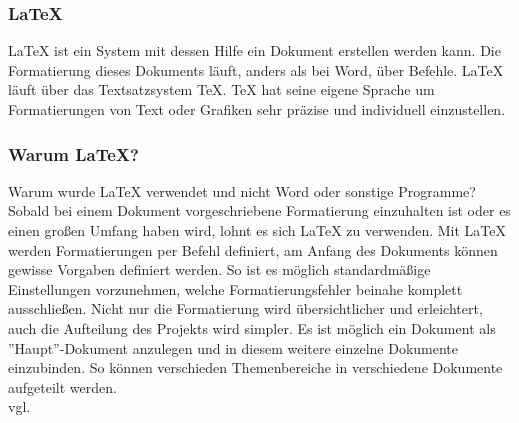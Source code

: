 \subsubsection {LaTeX}
\label{sec:LaTeX}
LaTeX ist ein System mit dessen Hilfe ein Dokument erstellen werden kann. Die Formatierung dieses Dokuments läuft, anders als bei Word, über Befehle. LaTeX läuft über das Textsatzsystem TeX. TeX hat seine eigene Sprache um Formatierungen von Text oder Grafiken sehr präzise und individuell einzustellen. 
\subsubsection{Warum LaTeX?} 
\label{sec:WarumLaTeX}
Warum wurde LaTeX verwendet und nicht Word oder sonstige Programme? Sobald bei einem Dokument vorgeschriebene Formatierung einzuhalten ist oder es einen großen Umfang haben wird, lohnt es sich LaTeX zu verwenden. Mit LaTeX werden Formatierungen per Befehl definiert, am Anfang des Dokuments können gewisse Vorgaben definiert werden. So ist es möglich standardmäßige Einstellungen vorzunehmen, welche Formatierungsfehler beinahe komplett ausschließen. Nicht nur die Formatierung wird übersichtlicher und erleichtert, auch die Aufteilung des Projekts wird simpler. Es ist möglich ein Dokument als ''Haupt''-Dokument anzulegen und in diesem weitere einzelne Dokumente einzubinden. So können verschieden Themenbereiche in verschiedene Dokumente aufgeteilt werden. \\vgl. \cite{TechnologieLaTeX} 